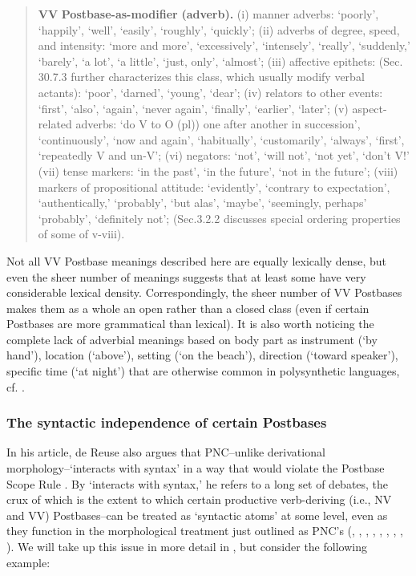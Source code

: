 \documentclass[output=paper]{langscibook}
\begin{document}
\begin{quote}
\textbf{VV} \textbf{Postbase-as-modifier} \textbf{(adverb).} (i) manner adverbs: `poorly', `happily', `well', `easily', `roughly', `quickly'; (ii) adverbs of degree, speed, and intensity: `more and more', `excessively', `intensely', `really', `suddenly,' `barely', `a lot', `a little', `just, only', `almost'; (iii) affective epithets: (Sec. 30.7.3 further characterizes this class, which usually modify verbal actants): `poor', `darned', `young', `dear'; (iv) relators to other events: `first', `also', `again', `never again', `finally', `earlier', `later'; (v) aspect-related adverbs: `do V to O (pl)) one after another in succession', `continuously', `now and again', `habitually', `customarily', `always', `first', `repeatedly V and un-V'; (vi) negators: `not', `will not', `not yet', `don't V!' (vii) tense markers: `in the past', `in the future', `not in the future'; (viii) markers of propositional attitude: `evidently', `contrary to expectation', `authentically,' `probably', `but alas', `maybe', `seemingly, perhaps' `probably', `definitely not'; (Sec.3.2.2 discusses special ordering properties of some of v-viii).
\end{quote}

Not all VV Postbase meanings described here are equally lexically dense, but even the sheer number of meanings suggests that at least some have very considerable lexical density. Correspondingly, the sheer number of VV Postbases makes them as a whole an open rather than a closed class (even if certain Postbases are more grammatical than lexical). It is also worth noticing the complete lack of adverbial meanings based on body part as instrument (`by hand'), location (`above'), setting (`on the beach'), direction (`toward speaker'), specific time (`at night') that are otherwise common in polysynthetic languages, cf. \citealt{Mattissen2017}.

\subsubsection{The syntactic independence of certain Postbases} \label{sec:3.4.3}

In his article, de Reuse also argues that PNC--unlike derivational morphology--`interacts with syntax' in a way that would violate the Postbase Scope Rule . By `interacts with syntax,' he refers to a long set of debates, the crux of which is the extent to which certain productive verb-deriving (i.e., NV and VV) Postbases--can be treated as `syntactic atoms' at some level, even as they function in the morphological treatment just outlined as PNC's (\citealt{Sadock1980, sadock1991autolexical}, \citealt{Woodbury1986}, \citealt{Mithun1984}, \citealt{Baker1988}, \citealt{Reuse1994}, \citealt{Johns2007}, \citealt{Compton2010}, \citealt{Fortescue2015}, \citealt{Yuan2018}). We will take up this issue in more detail in , but consider the following example:
\end{document}
